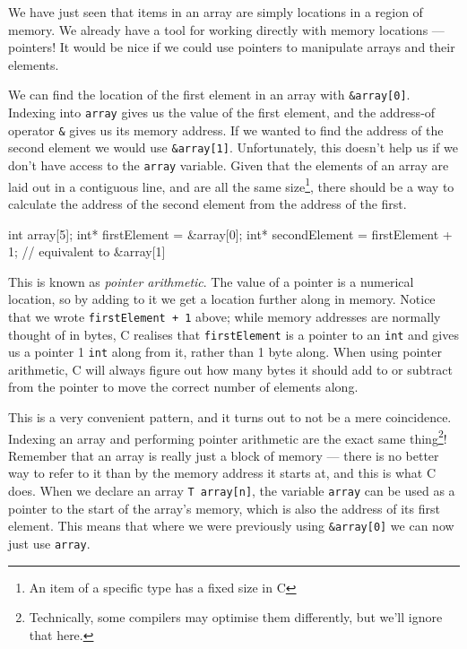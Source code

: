 We have just seen that items in an array are simply locations in a region of memory.
We already have a tool for working directly with memory locations --- pointers!
It would be nice if we could use pointers to manipulate arrays and their elements.

We can find the location of the first element in an array with \lstinline!&array[0]!.
Indexing into \lstinline!array! gives us the value of the first element, and the address-of operator \lstinline!&! gives us its memory address.
If we wanted to find the address of the second element we would use \lstinline!&array[1]!.
Unfortunately, this doesn't help us if we don't have access to the \lstinline!array! variable.
Given that the elements of an array are laid out in a contiguous line, and are all the same size\footnote{An item of a specific type has a fixed size in C}, there should be a way to calculate the address of the second element from the address of the first.

\begin{codeblock}
int array[5];
int* firstElement = &array[0];
int* secondElement = firstElement + 1; // equivalent to &array[1]
\end{codeblock}

This is known as \emph{pointer arithmetic}.
The value of a pointer is a numerical location, so by adding to it we get a location further along in memory.
Notice that we wrote \lstinline!firstElement + 1! above; while memory addresses are normally thought of in bytes, C realises that \lstinline{firstElement} is a pointer to an \lstinline!int! and gives us a pointer 1 \lstinline!int! along from it, rather than 1 byte along.
When using pointer arithmetic, C will always figure out how many bytes it should add to or subtract from the pointer to move the correct number of elements along.

This is a very convenient pattern, and it turns out to not be a mere coincidence.
Indexing an array and performing pointer arithmetic are the exact same thing\footnote{Technically, some compilers may optimise them differently, but we'll ignore that here.}!
Remember that an array is really just a block of memory --- there is no better way to refer to it than by the memory address it starts at, and this is what C does.
When we declare an array \lstinline!T array[n]!, the variable \lstinline!array! can be used as a pointer to the start of the array's memory, which is also the address of its first element.
This means that where we were previously using \lstinline!&array[0]! we can now just use \lstinline!array!.

